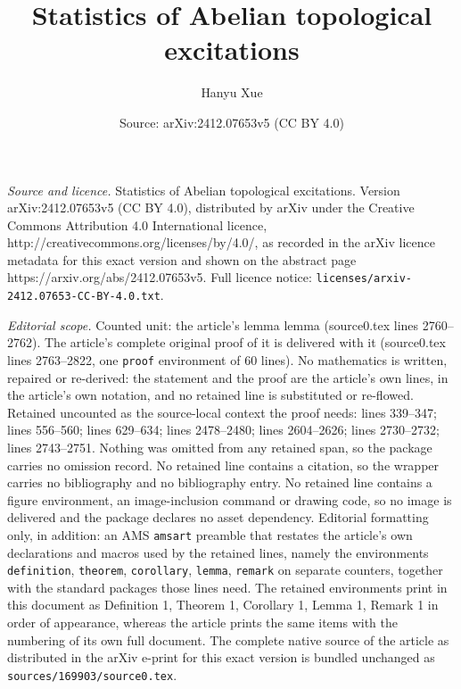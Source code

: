 \documentclass[10pt,a4paper]{amsart}
\title{Statistics of Abelian topological excitations}
\author{Hanyu Xue}
\date{Source: arXiv:2412.07653v5 (CC BY 4.0)}
\begin{document}
\maketitle

\noindent\emph{Source and licence.} Statistics of Abelian topological excitations. Version arXiv:2412.07653v5 (CC BY 4.0), distributed by arXiv under the Creative Commons Attribution 4.0 International licence, http://creativecommons.org/licenses/by/4.0/, as recorded in the arXiv licence metadata for this exact version and shown on the abstract page https://arxiv.org/abs/2412.07653v5. Full licence notice: \texttt{licenses/arxiv-2412.07653-CC-BY-4.0.txt}.\par\smallskip

\noindent\textit{Editorial scope.} Counted unit: the article's lemma lemma (source0.tex lines 2760--2762). The article's complete original proof of it is delivered with it (source0.tex lines 2763--2822, one \texttt{proof} environment of 60 lines). No mathematics is written, repaired or re-derived: the statement and the proof are the article's own lines, in the article's own notation, and no retained line is substituted or re-flowed.  Retained uncounted as the source-local context the proof needs: lines 339--347; lines 556--560; lines 629--634; lines 2478--2480; lines 2604--2626; lines 2730--2732; lines 2743--2751.  Nothing was omitted from any retained span, so the package carries no omission record.  No retained line contains a citation, so the wrapper carries no bibliography and no bibliography entry.  No retained line contains a figure environment, an image-inclusion command or drawing code, so no image is delivered and the package declares no asset dependency.  Editorial formatting only, in addition: an AMS \texttt{amsart} preamble that restates the article's own declarations and macros used by the retained lines, namely the environments \texttt{definition}, \texttt{theorem}, \texttt{corollary}, \texttt{lemma}, \texttt{remark} on separate counters, together with the standard packages those lines need.  The retained environments print in this document as Definition 1, Theorem 1, Corollary 1, Lemma 1, Remark 1 in order of appearance, whereas the article prints the same items with the numbering of its own full document.  The complete native source of the article as distributed in the arXiv e-print for this exact version is bundled unchanged as \texttt{sources/169903/source0.tex}.
\end{document}
